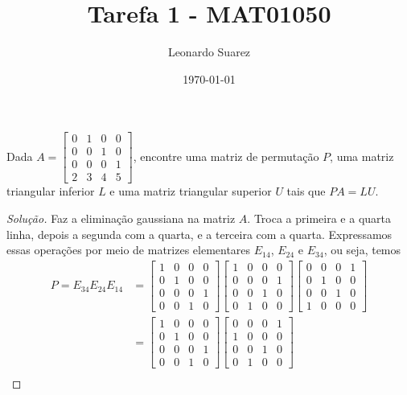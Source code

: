 \documentclass{article}
\title{Tarefa 1 - MAT01050}
\author{Leonardo Suarez}
\date{\today}
\begin{document}
\maketitle

\begin{prblm}
    Dada \(\displaystyle A = \begin{bmatrix} 0 & 1 & 0 & 0 \\ 0 & 0 & 1 & 0 \\ 0 & 0 & 0 & 1 \\ 2 & 3 & 4 & 5 \end{bmatrix}\), encontre uma matriz de permutação \(P\), uma matriz triangular inferior \(L\) e uma matriz triangular superior \(U\) tais que \(PA = LU\).
\end{prblm}

\begin{proof}[Solução]
    Faz a eliminação gaussiana na matriz \(A\). Troca a primeira e a quarta linha, depois a segunda com a quarta, e a terceira com a quarta. Expressamos essas operações por meio de matrizes elementares \(E_{14}\), \(E_{24}\) e \(E_{34}\), ou seja, temos
    \begin{align}
        P = E_{34}E_{24}E_{14} &= \begin{bmatrix} 1 & 0 & 0 & 0 \\ 0 & 1 & 0 & 0 \\ 0 & 0 & 0 & 1 \\ 0 & 0 & 1 & 0 \end{bmatrix} \begin{bmatrix} 1 & 0 & 0 & 0 \\ 0 & 0 & 0 & 1 \\ 0 & 0 & 1 & 0 \\ 0 & 1 & 0 & 0 \end{bmatrix} \begin{bmatrix} 0 & 0 & 0 & 1 \\ 0 & 1 & 0 & 0 \\ 0 & 0 & 1 & 0 \\ 1 & 0 & 0 & 0 \end{bmatrix} \\
        &= \begin{bmatrix} 1 & 0 & 0 & 0 \\ 0 & 1 & 0 & 0 \\ 0 & 0 & 0 & 1 \\ 0 & 0 & 1 & 0 \end{bmatrix} \begin{bmatrix} 0 & 0 & 0 & 1 \\ 1 & 0 & 0 & 0 \\ 0 & 0 & 1 & 0 \\ 0 & 1 & 0 & 0 \end{bmatrix} \\ 

\end{align}
\end{proof}
\end{document}
